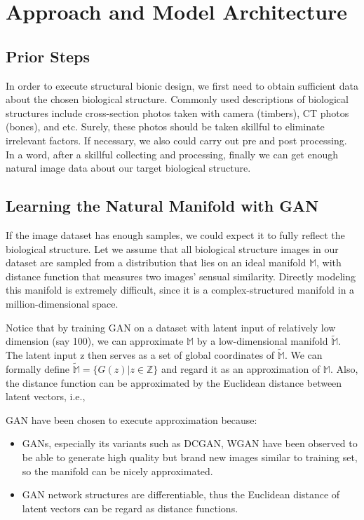 \chapter{Approach and Model Architecture}

\section{Prior Steps}
In order to execute structural bionic design, we first need to obtain sufficient data about the chosen biological structure. Commonly used descriptions of biological structures include cross-section photos taken with camera (timbers), CT photos (bones), and etc. Surely, these photos should be taken skillful to eliminate irrelevant factors. If necessary, we also could carry out pre and post processing. In a word, after a skillful collecting and processing, finally we can get enough natural image data about our target biological structure.

\section{Learning the Natural Manifold with GAN}
If the image dataset has enough samples, we could expect it to fully reflect the biological structure. Let we assume that all biological structure images in our dataset are sampled from a distribution that lies on an ideal manifold $\mathbb{M}$, with distance function that measures two images’ sensual similarity. Directly modeling this manifold is extremely difficult, since it is a complex-structured manifold in a million-dimensional space. 

Notice that by training GAN on a dataset with latent input of relatively low dimension (say 100), we can approximate $\mathbb{M}$ by a low-dimensional manifold $\widetilde{\mathbb{M}}$. The latent input z then serves as a set of global coordinates of $\widetilde{\mathbb{M}}$. We can formally define $\widetilde{\mathbb{M}} = \{G(z)|z\in\mathbb{Z}\}$ and regard it as an approximation of $\mathbb{M}$. Also, the distance function can be approximated by the Euclidean distance between latent vectors, i.e., 

GAN have been chosen to execute approximation because: 
\begin{itemize}
\item GANs, especially its variants such as DCGAN, WGAN have been observed to be able to generate high quality but brand new images similar to training set, so the manifold can be nicely approximated. 
\item GAN network structures are differentiable, thus the Euclidean distance of latent vectors can be regard as distance functions.
\end{itemize}
